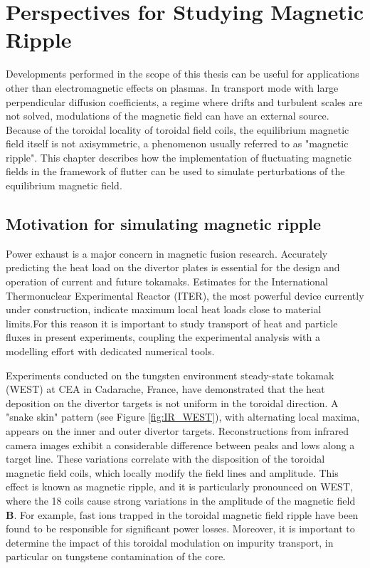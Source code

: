 \chapter{Perspectives for Studying Magnetic Ripple}
\label{chap:RippleMagnetic}

Developments performed in the scope of this thesis can be useful for applications other than electromagnetic effects on plasmas. In transport mode with large perpendicular diffusion coefficients, a regime where drifts and turbulent scales are not solved, modulations of the magnetic field can have an external source. Because of the toroidal locality of toroidal field coils, the equilibrium magnetic field itself is not axisymmetric, a phenomenon usually referred to as "magnetic ripple". This chapter describes how the implementation of fluctuating magnetic fields in the framework of flutter can be used to simulate perturbations of the equilibrium magnetic field.

\section{Motivation for simulating magnetic ripple}\label{sec:ripple_intro}

Power exhaust is a major concern in magnetic fusion research. Accurately predicting the heat load on the divertor plates is essential for the design and operation of current and future tokamaks. Estimates for the International Thermonuclear Experimental Reactor (ITER), the most powerful device currently under construction, indicate maximum local heat loads close to material limits\cite{gunn2017surface}.For this reason it is important to study transport of heat and particle fluxes in present experiments, coupling the experimental analysis with a modelling effort  with dedicated numerical tools. \newline

Experiments conducted on the tungsten environment steady-state tokamak (WEST) at CEA in Cadarache, France\cite{bucalossi2022}, have demonstrated that the heat deposition on the divertor targets is not uniform in the toroidal direction. A "snake skin" pattern (see Figure \ref{fig:IR_WEST}), with alternating local maxima, appears on the inner and outer divertor targets. Reconstructions from infrared camera images exhibit a considerable difference between peaks and lows along a target line. These variations correlate with the disposition of the toroidal magnetic field coils, which locally modify the field lines and amplitude. This effect is known as magnetic ripple\cite{tani1981effect}, and it is particularly pronounced on WEST, where the 18 coils cause strong variations in the amplitude of the magnetic field $\textbf{B}$. For example, fast ions trapped in the toroidal magnetic field ripple have been found to be responsible for significant power losses\cite{moiraf2023optimization}. Moreover, it is important to determine the impact of this toroidal modulation on impurity transport, in particular on tungstene contamination of the core\cite{diGenova2021modelling}. \newline

